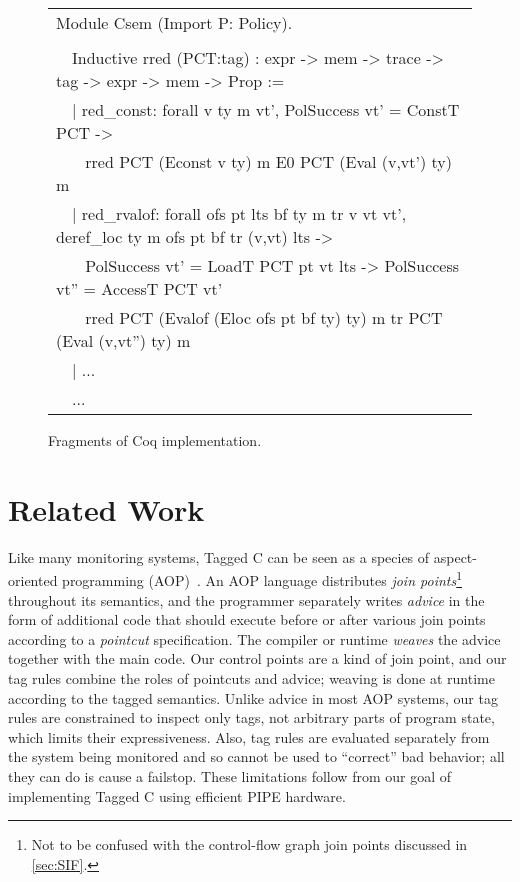 \documentclass{llncs}
\begin{document}
\begin{figure}[t]
{    \begin{tabular}{l}
      Module Csem (Import P: Policy). \\
      \\
      \ \ Inductive rred (PCT:tag) : expr -> mem -> trace -> tag -> expr -> mem -> Prop := \\
      \ \ | red\_const: forall v ty m vt', PolSuccess vt' = ConstT PCT -> \\
      \ \ ~ rred PCT (Econst v ty) m E0 PCT (Eval (v,vt') ty) m \\
      \ \ | red\_rvalof: forall ofs pt lts bf ty m tr v vt vt', deref\_loc ty m ofs pt bf tr (v,vt) lts -> \\
      \ \ ~ PolSuccess vt' = LoadT PCT pt vt lts -> PolSuccess vt'' = AccessT PCT vt' \\
      \ \ ~ rred PCT (Evalof (Eloc ofs pt bf ty) ty) m tr PCT (Eval (v,vt'') ty) m \\
      \ \ | ...\\
      \ \ ...
      \end{tabular} }
    
  \caption{Fragments of Coq implementation.}
  \label{fig:fullcode}
\end{figure}

\section{Related Work}
\label{sec:related}

Like many monitoring systems, Tagged C can be seen as a species of 
aspect-oriented programming (AOP)~\cite{Kiczales97:AOP}. %
An AOP language distributes {\em join points}\footnote{Not to be confused with the control-flow graph
join points discussed in \cref{sec:SIF}.} throughout its semantics, 
and the programmer separately writes {\em advice} in the form of
additional code that should execute before or after various join points according to
a {\em pointcut} specification. The compiler or runtime 
{\em weaves} the advice together with the main code.
Our control points are a kind of join point, and our tag rules combine the roles of pointcuts and advice; weaving
is done at runtime according to the tagged semantics. Unlike advice in most AOP systems, our
tag rules are constrained to inspect only tags, not arbitrary parts of program state, which limits their expressiveness. 
Also, tag rules are evaluated separately from the system being monitored and so cannot be used to ``correct'' bad
behavior; all they can do is cause a failstop.  
These limitations follow from our goal of implementing Tagged C using efficient PIPE hardware. 
\end{document}
